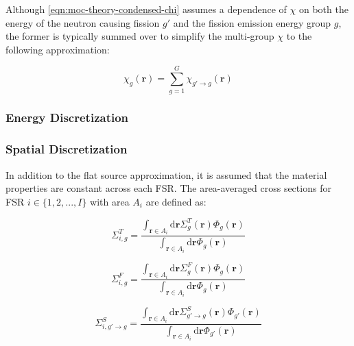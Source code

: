 Although \autoref{eqn:moc-theory-condensed-chi} assumes a dependence of $\chi$ on both the energy of the neutron causing fission $g'$ and the fission emission energy group $g$, the former is typically summed over to simplify the multi-group $\chi$ to the following approximation:

\begin{equation}
\label{eqn:moc-theory-condensed-chi-group}
\chi_{g}(\mathbf{r}) = \displaystyle\sum\limits_{g=1}^{G}\chi_{g'\rightarrow g}(\mathbf{r})
\end{equation}


\subsubsection{Energy Discretization}
\label{subsubsec:chap2-energy-discrete}

\subsubsection{Spatial Discretization}
\label{subsubsec:chap2-space-discrete}

In addition to the flat source approximation, it is assumed that the material properties are constant across each FSR. The area-averaged cross sections for FSR $i \in \{1, 2, ..., I\}$ with area $A_{i}$ are defined as:

\begin{equation}
\label{eqn:chap2-area-avg-total-xs}
\Sigma_{i,g}^{T} = \frac{\int_{\mathbf{r}\in A_{i}}\mathrm{d}\mathbf{r}\Sigma_{g}^T(\mathbf{r})\Phi_{g}(\mathbf{r})}{\int_{\mathbf{r}\in A_{i}}\mathrm{d}\mathbf{r}\Phi_{g}(\mathbf{r})}
\end{equation}

\begin{equation}
\label{eqn:chap2-area-avg-fission-xs}
\Sigma_{i,g}^{F} = \frac{\int_{\mathbf{r}\in A_{i}}\mathrm{d}\mathbf{r}\Sigma_{g}^F(\mathbf{r})\Phi_{g}(\mathbf{r})}{\int_{\mathbf{r}\in A_{i}}\mathrm{d}\mathbf{r}\Phi_{g}(\mathbf{r})}
\end{equation}

\begin{equation}
\label{eqn:chap2-area-avg-scatter-xs}
\Sigma_{i,g'\rightarrow g}^{S} = \frac{\int_{\mathbf{r}\in A_{i}}\mathrm{d}\mathbf{r}\Sigma_{g'\rightarrow g}^S(\mathbf{r})\Phi_{g'}(\mathbf{r})}{\int_{\mathbf{r}\in A_{i}}\mathrm{d}\mathbf{r}\Phi_{g'}(\mathbf{r})}
\end{equation}

